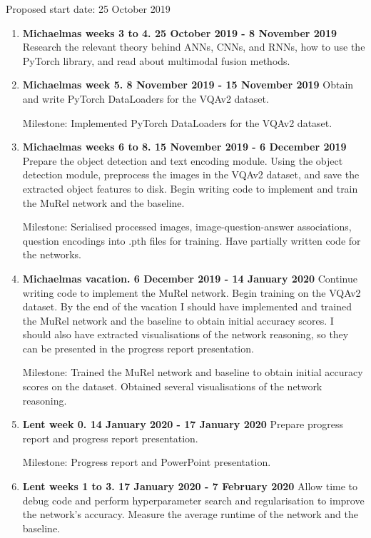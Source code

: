 \documentclass[12pt]{article}
\begin{document}
Proposed start date: 25 October 2019
\begin{enumerate}
	\item {\fontsize{12.5}{16} \textbf{Michaelmas weeks 3 to 4. 25 October 2019 - 8 November 2019}} Research the relevant theory behind ANNs, CNNs, and RNNs, how to use the PyTorch library, and read about multimodal fusion methods.
	\item {\fontsize{12.5}{16} \textbf{Michaelmas week 5. 8 November 2019 - 15 November 2019}} Obtain and write PyTorch DataLoaders for the VQAv2 dataset.
	
	Milestone: Implemented PyTorch DataLoaders for the VQAv2 dataset.
	
	\item {\fontsize{12.5}{16} \textbf{Michaelmas weeks 6 to 8. 15 November 2019 - 6 December 2019}} Prepare the object detection and text encoding module. Using the object detection module, preprocess the images in the VQAv2 dataset, and save the extracted object features to disk. Begin writing code to implement and train the MuRel network and the baseline.
	
	Milestone: Serialised processed images, image-question-answer associations, question encodings into .pth files for training. Have partially written code for the networks.
	
	\item {\fontsize{12.5}{16} \textbf{Michaelmas vacation. 6 December 2019 - 14 January 2020}} Continue writing code to implement the MuRel network. Begin training on the VQAv2 dataset. By the end of the vacation I should have implemented and trained the MuRel network and the baseline to obtain initial accuracy scores. I should also have extracted visualisations of the network reasoning, so they can be presented in the progress report presentation.
	
	Milestone: Trained the MuRel network and baseline to obtain initial accuracy scores on the dataset. Obtained several visualisations of the network reasoning.
	
	\item {\fontsize{12.5}{16} \textbf{Lent week 0. 14 January 2020 - 17 January 2020 }} Prepare progress report and progress report presentation.
	
	Milestone: Progress report and PowerPoint presentation.
	
	\item {\fontsize{12.5}{16} \textbf{Lent weeks 1 to 3. 17 January 2020 - 7 February 2020 }} Allow time to debug code and perform hyperparameter search and regularisation to improve the network's accuracy. Measure the average runtime of the network and the baseline.
	

\end{enumerate}
\end{document}

